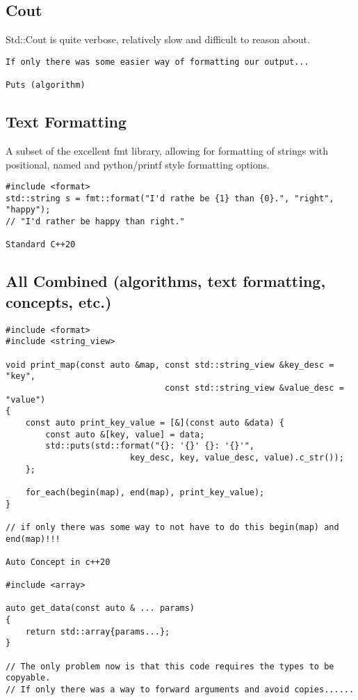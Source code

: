 \subsection{Cout}

Std::Cout is quite verbose, relatively slow and difficult to reason about. 

\begin{verbatim}
If only there was some easier way of formatting our output...

Puts (algorithm)
\end{verbatim}

\subsection{Text Formatting}

A subset of the excellent {fmt} library, allowing for formatting of strings with positional,
named and python/printf style formatting options.

\begin{verbatim}
#include <format>
std::string s = fmt::format("I'd rathe be {1} than {0}.", "right", "happy");
// "I'd rather be happy than right."

Standard C++20
\end{verbatim}

\subsection{All Combined (algorithms, text formatting, concepts, etc.)}

\begin{verbatim}
#include <format>
#include <string_view>

void print_map(const auto &map, const std::string_view &key_desc = "key",
                                const std::string_view &value_desc = "value")
{
    const auto print_key_value = [&](const auto &data) { 
        const auto &[key, value] = data;
        std::puts(std::format("{}: '{}' {}: '{}'",
                         key_desc, key, value_desc, value).c_str());
    };

    for_each(begin(map), end(map), print_key_value);
}

// if only there was some way to not have to do this begin(map) and end(map)!!!

Auto Concept in c++20

#include <array>

auto get_data(const auto & ... params)
{
    return std::array{params...};
}

// The only problem now is that this code requires the types to be copyable.
// If only there was a way to forward arguments and avoid copies......
\end{verbatim}


